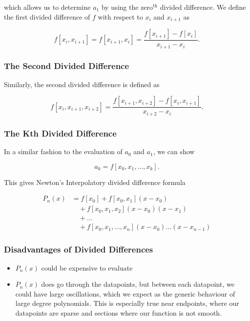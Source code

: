which allows us to determine $a_1$ by using the $\text{zero}^{\text{th}}$ 
divided difference. We define the first divided difference of $f$ with respect
to $x_i$ and $x_{i+1}$ as

\[
  f[x_i, x_{i+1}] = f[x_{i+1}, x_i] = \frac{f[x_{i+1}]-f[x_i]}{x_{i+1}-x_i}
.\]


\subsubsection{The Second Divided Difference}

Similarly, the second divided difference is defined as 

\[
  f[x_i, x_{i+1}, x_{i+2}] = \frac{f[x_{i+1}, x_{i+2}] - f[x_i, x_{i+1}]}{x_{i+2}-x_i}
.\]

\subsubsection{The Kth Divided Difference}

In a similar fashion to the evaluation of $a_0$ and $a_1$, we can show

\[
  a_k = f[x_0, x_1, \dots, x_k]
.\]

This gives Newton's Interpolatory divided difference formula

\begin{align*}  
  P_n(x) &= f[x_0] + f[x_0, x_1] (x-x_0) \\
         &\quad+ f[x_0, x_1, x_2] (x-x_0) (x-x_1) \\
         &\quad+ \dots \\
         &\quad+ f[x_0, x_1, \dots, x_n](x-x_0) \dots (x-x_{n-1})
\end{align*}

\subsubsection{Disadvantages of Divided Differences}

\begin{itemize}
\item $P_n(x)$ could be expensive to evaluate
\item $P_n(x)$ does go through the datapoints, but between each datapoint, we
  could have large oscillations, which we expect as the generic behaviour of
  large degree polynomials.
  \subitem This is especially true near endpoints, where our datapoints are
  sparse and sections where our function is not smooth.
\end{itemize}

